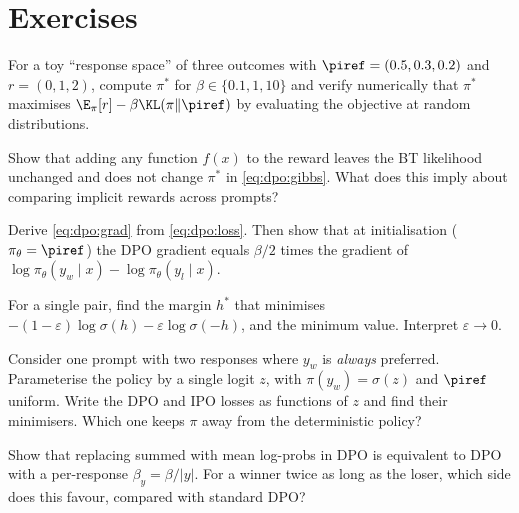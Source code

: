 \section{Exercises}\label{sec:dpo:exercises}

\begin{exercise}
For a toy ``response space'' of three outcomes with $\piref=(0.5,0.3,0.2)$ and $r=(0,1,2)$,
compute $\pi^*$ for $\beta\in\{0.1,1,10\}$ and verify numerically that $\pi^*$ maximises
$\E_\pi[r]-\beta\KL(\pi\|\piref)$ by evaluating the objective at random distributions.
\end{exercise}

\begin{exercise}[Z cancels]
Show that adding any function $f(x)$ to the reward leaves the BT likelihood unchanged and does not
change $\pi^*$ in \eqref{eq:dpo:gibbs}. What does this imply about comparing implicit rewards across
prompts?
\end{exercise}

\begin{exercise}
Derive \eqref{eq:dpo:grad} from \eqref{eq:dpo:loss}. Then show that at initialisation
($\pi_\theta=\piref$) the DPO gradient equals $\beta/2$ times the gradient of
$\log\pi_\theta(y_w\mid x)-\log\pi_\theta(y_l\mid x)$.
\end{exercise}

\begin{exercise}
For a single pair, find the margin $h^*$ that minimises
$-(1-\varepsilon)\log\sigma(h)-\varepsilon\log\sigma(-h)$, and the minimum value. Interpret
$\varepsilon\to0$.
\end{exercise}

\begin{exercise}
Consider one prompt with two responses where $y_w$ is \emph{always} preferred. Parameterise the
policy by a single logit $z$, with $\pi(y_w)=\sigma(z)$ and $\piref$ uniform. Write the DPO and IPO
losses as functions of $z$ and find their minimisers. Which one keeps $\pi$ away from the
deterministic policy?
\end{exercise}

\begin{exercise}
Show that replacing summed with mean log-probs in DPO is equivalent to DPO with a
per-response $\beta_y=\beta/|y|$. For a winner twice as long as the loser, which side does this
favour, compared with standard DPO?
\end{exercise}

